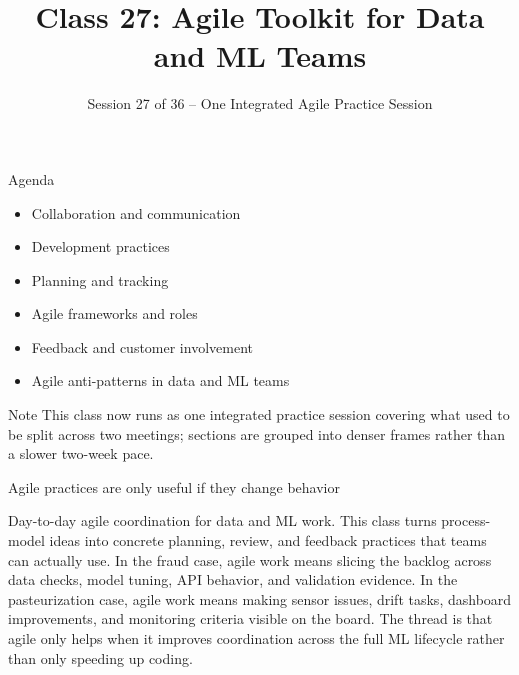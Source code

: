 

\title{Class 27: Agile Toolkit for Data and ML Teams}
\subtitle{Session 27 of 36 -- One Integrated Agile Practice Session}
\author{\coursename}
\date{}



\frame{\titlepage \coursefooter}

\begin{frame}{Agenda}
\begin{itemize}
\item Collaboration and communication
\item Development practices
\item Planning and tracking
\item Agile frameworks and roles
\item Feedback and customer involvement
\item Agile anti-patterns in data and ML teams
\end{itemize}
\begin{block}{Note}
This class now runs as one integrated practice session covering what used to be split across two meetings; sections are grouped into denser frames rather than a slower two-week pace.
\end{block}
\coursefooter
\end{frame}

\begin{frame}{Agile practices are only useful if they change behavior}
\coursefooter
\end{frame}

\coursecontextframe
{Day-to-day agile coordination for data and ML work.}
{This class turns process-model ideas into concrete planning, review, and feedback practices that teams can actually use.}
{In the fraud case, agile work means slicing the backlog across data checks, model tuning, API behavior, and validation evidence.}
{In the pasteurization case, agile work means making sensor issues, drift tasks, dashboard improvements, and monitoring criteria visible on the board.}
{The thread is that agile only helps when it improves coordination across the full ML lifecycle rather than only speeding up coding.}

